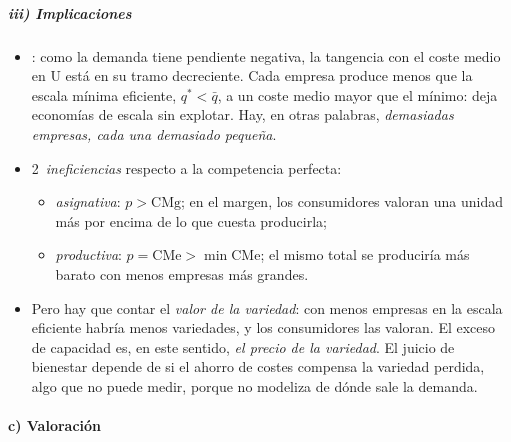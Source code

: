\documentclass[11pt]{article}
\begin{document}
\subparagraph{iii) Implicaciones}

\begin{itemize}
\item {}: como la demanda tiene pendiente negativa, la tangencia con el coste medio en U está en su tramo decreciente. Cada empresa produce menos que la escala mínima eficiente, $q^*<\bar{q}$, a un coste medio mayor que el mínimo: deja economías de escala sin explotar. Hay, en otras palabras, \emph{demasiadas empresas, cada una demasiado pequeña}\nocite{Kaldor1935Market}.
\item 2~\emph{ineficiencias} respecto a la competencia perfecta:
  \begin{itemize}
  \item \emph{asignativa}: $p>\mathrm{CMg}$; en el margen, los consumidores valoran una unidad más por encima de lo que cuesta producirla;
  \item \emph{productiva}: $p=\mathrm{CMe}>\min\mathrm{CMe}$; el mismo total se produciría más barato con menos empresas más grandes.
  \end{itemize}
\item Pero hay que contar el \emph{valor de la variedad}: con menos empresas en la escala eficiente habría menos variedades, y los consumidores las valoran. El exceso de capacidad es, en este sentido, \emph{el precio de la variedad}. El juicio de bienestar depende de si el ahorro de costes compensa la variedad perdida, algo que  no puede medir, porque no modeliza de dónde sale la demanda.
\end{itemize}

\paragraph{c) Valoración}
\end{document}
